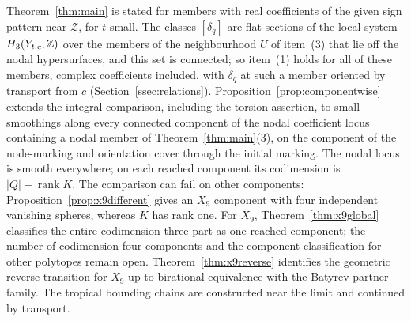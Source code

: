 Theorem~\ref{thm:main} is stated for members with real coefficients of the given sign pattern near $\mathcal Z$, for
$t$ small. The classes $[\delta_q]$ are flat sections of the local system $H_3(Y_{t,c};\mathbb Z)$ over the members of the
neighbourhood $U$ of item~(3) that lie off the nodal hypersurfaces, and this set is connected; so item~(1) holds for all
of these members, complex coefficients included, with $\delta_q$ at such a member oriented by transport from $c$
(Section~\ref{ssec:relations}). Proposition~\ref{prop:componentwise} extends the integral comparison, including the
torsion assertion, to small smoothings along every connected component of the nodal coefficient locus containing
a nodal member of Theorem~\ref{thm:main}(3), on the component of the node-marking and orientation cover through the initial marking.
The nodal locus is smooth everywhere; on each reached component its codimension is $|Q|-\operatorname{rank}K$.
The comparison can fail on other components: Proposition~\ref{prop:x9different} gives an $X_9$ component with
four independent vanishing spheres, whereas $K$ has rank one. For $X_9$, Theorem~\ref{thm:x9global}
classifies the entire codimension-three part as one reached component; the number of codimension-four components
and the component classification for other polytopes remain open. Theorem~\ref{thm:x9reverse} identifies the
geometric reverse transition for $X_9$ up to birational equivalence with the Batyrev partner family.
The tropical bounding chains are constructed near the limit and continued by transport.
